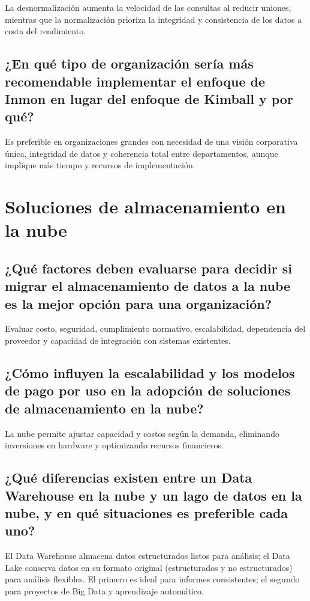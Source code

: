 \documentclass{../../../miPlantilla}
\begin{document}
La desnormalización aumenta la velocidad de las consultas al reducir uniones, mientras que la normalización prioriza la integridad y consistencia
de los datos a costa del rendimiento.

\subsection{¿En qué tipo de organización sería más recomendable implementar el enfoque de Inmon en lugar del enfoque de Kimball y por qué?}

Es preferible en organizaciones grandes con necesidad de una visión corporativa única, integridad de datos y coherencia total entre departamentos,
aunque implique más tiempo y recursos de implementación.


\newpage

\section{Soluciones de almacenamiento en la nube}

\subsection{¿Qué factores deben evaluarse para decidir si migrar el almacenamiento de datos a la nube es la mejor opción para una organización?}

Evaluar costo, seguridad, cumplimiento normativo, escalabilidad, dependencia del proveedor y capacidad de integración con sistemas existentes.

\subsection{¿Cómo influyen la escalabilidad y los modelos de pago por uso en la adopción de soluciones de almacenamiento en la nube?}

La nube permite ajustar capacidad y costos según la demanda, eliminando inversiones en hardware y optimizando recursos financieros.

\subsection{¿Qué diferencias existen entre un Data Warehouse en la nube y un lago de datos en la nube, y en qué situaciones es preferible cada uno?}

El Data Warehouse almacena datos estructurados listos para análisis; el Data Lake conserva datos en su formato original (estructurados y no estructurados)
para análisis flexibles. El primero es ideal para informes consistentes; el segundo para proyectos de Big Data y aprendizaje automático.
\end{document}
